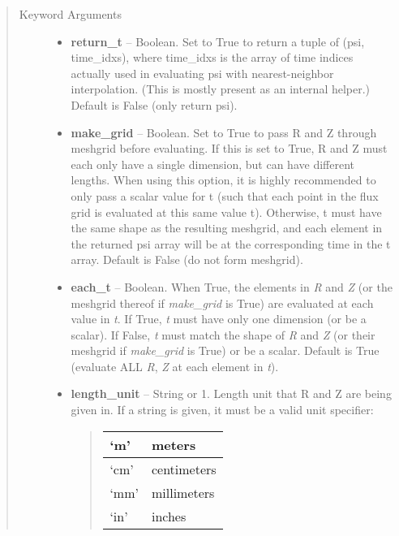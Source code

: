 \documentclass[letterpaper,10pt,english]{sphinxmanual}
\begin{document}
\begin{fulllineitems}
\begin{fulllineitems}
\begin{quote}
\begin{description}
\begin{itemize}
\end{itemize}

\item[{Keyword Arguments}] \leavevmode\begin{itemize}
\item {} 
\textbf{return\_t} --
Boolean.
Set to True to return a tuple of (psi, time\_idxs),
where time\_idxs is the array of time indices actually used in
evaluating psi with nearest-neighbor interpolation. (This is
mostly present as an internal helper.) Default is False (only
return psi).

\item {} 
\textbf{make\_grid} --
Boolean.
Set to True to pass R and Z through meshgrid
before evaluating. If this is set to True, R and Z must each
only have a single dimension, but can have different lengths.
When using this option, it is highly recommended to only pass
a scalar value for t (such that each point in the flux grid is
evaluated at this same value t). Otherwise, t must have the
same shape as the resulting meshgrid, and each element in the
returned psi array will be at the corresponding time in the t
array. Default is False (do not form meshgrid).

\item {} 
\textbf{each\_t} --
Boolean.
When True, the elements in \emph{R} and \emph{Z} (or the meshgrid thereof
if \emph{make\_grid} is True) are evaluated at each value in \emph{t}. If
True, \emph{t} must have only one dimension (or be a scalar). If
False, \emph{t} must match the shape of \emph{R} and \emph{Z} (or their
meshgrid if \emph{make\_grid} is True) or be a scalar. Default is True
(evaluate ALL \emph{R}, \emph{Z} at each element in \emph{t}).

\item {} 
\textbf{length\_unit} --
String or 1.
Length unit that R and Z are being given
in. If a string is given, it must be a valid unit specifier:
\begin{quote}

\begin{tabulary}{\linewidth}{|L|L|}
\hline

`m'
 & 
meters
\\\hline

`cm'
 & 
centimeters
\\\hline

`mm'
 & 
millimeters
\\\hline

`in'
 & 
inches
\\\hline


\end{tabulary}
\end{quote}
\end{itemize}
\end{description}
\end{quote}
\end{fulllineitems}
\end{fulllineitems}
\end{document}
